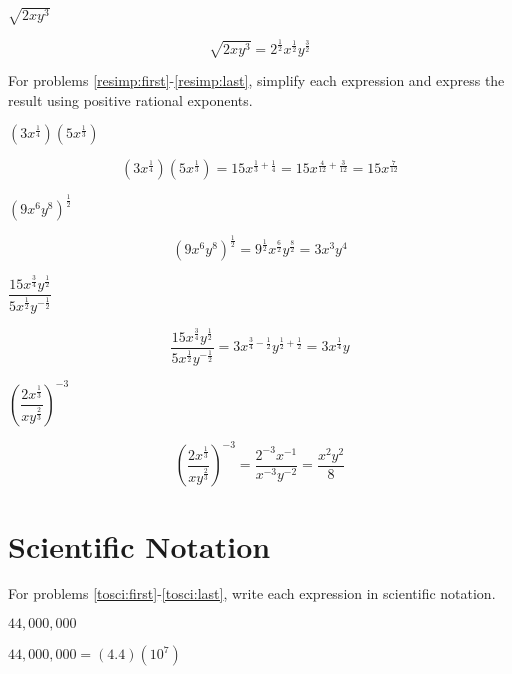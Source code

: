 \documentclass[fleqn,addpoints]{exam}
\begin{document}
\begin{questions}
\question[3] \( \sqrt{2xy^3} \)
\label{pre:last}
\begin{solution}[3 cm]
\[
  \sqrt{2xy^3} = 2^{\frac{1}{2}} x^{\frac{1}{2}} y^{\frac{3}{2}}
\]
\end{solution}

\ifprintanswers
\else
\pagebreak
\fi

For problems \ref{resimp:first}-\ref{resimp:last}, simplify each expression and express the result using positive
rational exponents.

\question[5] \( (3x^{\frac{1}{4}})(5x^{\frac{1}{3}}) \)
\label{resimp:first}
\begin{solution}[3 cm]
\[
  (3x^{\frac{1}{4}})(5x^{\frac{1}{3}}) = 15 x^{\frac{1}{3} + \frac{1}{4}} = 15 x^{\frac{4}{12} + \frac{3}{12}} = 15 x^{\frac{7}{12}}
\]
\end{solution}

\question[5] \( (9x^6y^8)^{\frac{1}{2}} \)
\begin{solution}[3 cm]
\[
  (9x^6y^8)^{\frac{1}{2}} = 9^{\frac{1}{2}} x^{\frac{6}{2}} y^{\frac{8}{2}} = 3x^3y^4
\]
\end{solution}

\question[5] \( \dfrac{15x^{\frac{3}{4}} y^{\frac{1}{2}}} {5x^{\frac{1}{2}} y^{- \frac{1}{2}}} \)
\begin{solution}[3 cm]
\[
  \frac{15x^{\frac{3}{4}} y^{\frac{1}{2}}} {5x^{\frac{1}{2}} y^{- \frac{1}{2}}}
  = 3 x^{\frac{3}{4} - \frac{1}{2}} y^{\frac{1}{2} + \frac{1}{2}} 
  = 3 x^{\frac{1}{4}} y
\]
\end{solution}

\question[5] \( \left( \dfrac{2x^{\frac{1}{3}}}{xy^{\frac{2}{3}}} \right)^{-3} \)
\label{resimp:last}
\begin{solution}[3 cm]
\[
  \left( \dfrac{2x^{\frac{1}{3}}}{xy^{\frac{2}{3}}} \right)^{-3}
  = \frac{2^{-3} x^{-1}}{x^{-3}y^{-2}} = \frac{x^2y^2}{8}
\]
\end{solution}

\ifprintanswers
\else
\pagebreak
\fi

\section{Scientific Notation}

For problems \ref{tosci:first}-\ref{tosci:last}, write each expression in scientific notation.

\question[3] \( 44,000,000 \)
\label{tosci:first}
\begin{solution}[1 cm]
\( 44,000,000 = (4.4)(10^7)\)
\end{solution}


\end{questions}
\end{document}
